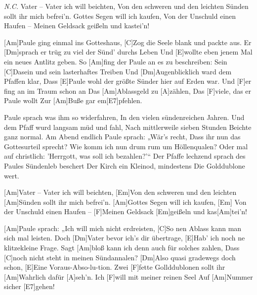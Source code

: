 

\begin{guitar}
	 {\footnotesize\textit{N.C.}}
	Vater – Vater ich will beichten,
	Von den schweren und den leichten Sünden sollt ihr mich befrei'n.
	Gottes Segen will ich kaufen,
	Von der Unschuld einen Haufen – Meinen Geldsack geißeln und kastei'n!
	
	[Am]Paule ging einmal ins Gotteshaus,
	[C]Zog die Seele blank und packte aus.
	Er [Dm]sprach er trüg zu viel der Sünd' durchs Leben
	Und [E]wollte eben jenem Mal ein neues Antlitz geben.
	So [Am]fing der Paule an es zu beschreiben:
	Sein [C]Dasein und sein lasterhaftes Treiben
	Und [Dm]Augenblicklich ward dem Pfaffen klar,
	Dass [E]Paule wohl der größte Sünder hier auf Erden war.
	Und [F]er fing an im Traum schon an 
	Das [Am]Ablassgeld zu [A]zählen,
	Das [F]viele, das er Paule wollt
	Zur [Am]Buße gar em[E7]pfehlen.
	
	Paule sprach was ihm so widerfahren,
	In den vielen sündenreichen Jahren.
	Und dem Pfaff wurd langsam müd und fahl,
	Nach mittlerweile sieben Stunden Beichte ganz normal.
	Am Abend endlich Paule sprach: „Wär's recht,
	Dass ihr nun das Gottesurteil sprecht?
	Wie komm ich nun drum rum um Höllenqualen?
	Oder mal auf christlich: 'Herrgott, was soll ich bezahlen?'“
	Der Pfaffe lechzend sprach des Paules 
	Sündenleb beschert
	Der Kirch ein Kleinod, mindestens
	Die Golddublone wert.
	
	[Am]Vater – Vater ich will beichten,
	[Em]Von den schweren und den leichten [Am]Sünden sollt ihr mich befrei'n. 
	[Am]Gottes Segen will ich kaufen,
	[Em] Von der Unschuld einen Haufen – [F]Meinen Geldsack [Em]geißeln und kas[Am]tei'n!
	
	[Am]Paule sprach: „Ich will mich nicht erdreisten,
	[C]So nen Ablass kann man sich mal leisten.
	Doch [Dm]Vater bevor ich's dir übertrage,
	[E]Hab' ich noch ne klitzekleine Frage.
	Sagt [Am]bloß kann ich denn auch für solches zahlen,
	Dass [C]noch nicht steht in meinen Sündannalen?
	[Dm]Also quasi gradewegs doch schon,
	[E]Eine Voraus-Abso-lu-tion.
	Zwei [F]fette Gollddublonen sollt ihr 
	[Am]Wahrlich dafür [A]seh'n.
	Ich [F]will mit meiner reinen Seel
	Auf [Am]Nummer sicher [E7]gehen!
	

\end{guitar}
